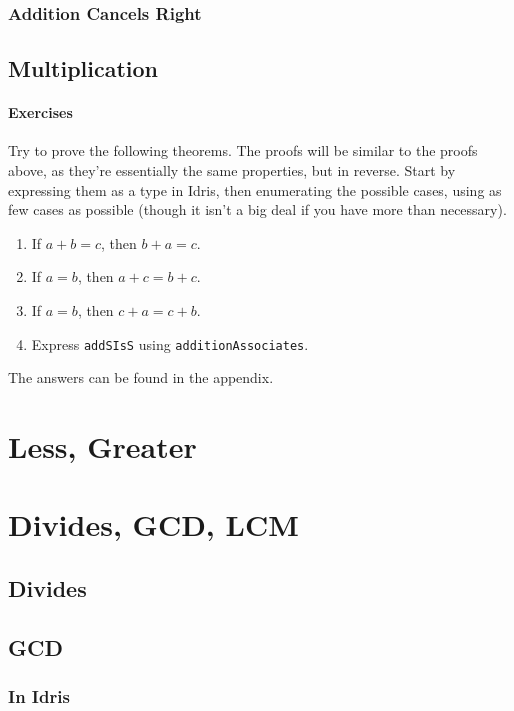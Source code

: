 \documentclass{article}
\newcommand{\inline}[1]{\texttt{#1}}
\begin{document}
\subsubsection{Addition Cancels Right}

\subsection{Multiplication}

\paragraph{Exercises}
Try to prove the following theorems.
The proofs will be similar to the proofs above, as they're essentially the same properties, but in reverse.
Start by expressing them as a type in Idris, then enumerating the possible cases, using as few cases as possible (though it isn't a big deal if you have more than necessary).

\begin{enumerate}
    \item If $a + b = c$, then $b + a = c$.
    \item If $a = b$, then $a + c = b + c$.
    \item If $a = b$, then $c + a = c + b$.
    \item Express \inline{addSIsS} using \inline{additionAssociates}.
\end{enumerate}

The answers can be found in the appendix.

\section{Less, Greater}

\section{Divides, GCD, LCM}
\subsection{Divides}

\subsection{GCD}
\subsubsection{In Idris}
\end{document}

